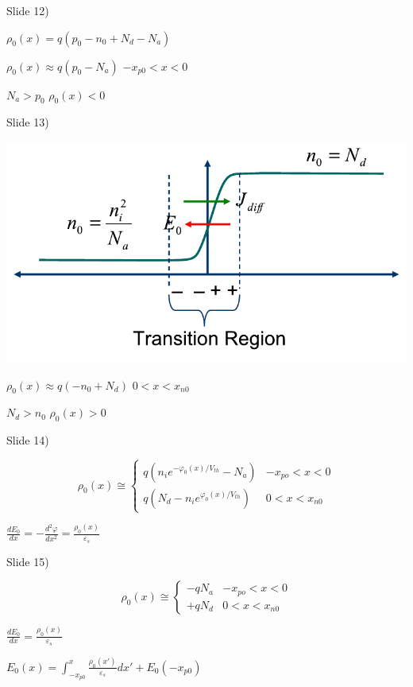 \documentclass{beamer}
\begin{document}
 \begin{frame}{Slide 12)}


 ${\rho _0}(x) = q({p_0} - {n_0} + {N_d} - {N_a})$

 ${\rho _0}(x) \approx q({p_0} - {N_a})$
 $ - {x_{p0}} < x < 0$

 ${N_a} > {p_0}$
 ${\rho _0}(x) < 0$

 \end{frame}

 \begin{frame}{Slide 13)}

\includegraphics[width=.6\columnwidth]{slide13}

 ${\rho _0}(x) \approx q( - {n_0} + {N_d})$
 $0 < x < {x_{n0}}$

 ${N_d} > {n_0}$
 ${\rho _0}(x) > 0$
 \end{frame}

 \begin{frame}{Slide 14)}


 \[
 \rho _0(x) \cong \left\{ 
  \begin{array}{*{20}{c}}
 q({n_i}{e^{ - {\varphi _0}(x)/{V_{th}}}} - {N_a}) &  - {x_{po}} < x < 0\\
 q({N_d} - {n_i}{e^{{\varphi _0}(x)/{V_{th}}}}) & 0 < x < {x_{n0}}
 \end{array} 
 \right.
 \]

 $\frac{{d{E_0}}}{{dx}} =  - \frac{{{d^2}\varphi }}{{d{x^2}}} = \frac{{{\rho _0}(x)}}{{{\varepsilon _s}}}$

 \end{frame}

 \begin{frame}{Slide 15)}


\[
{\rho _0}(x) \cong \left\{ 
	\begin{array}{*{20}{c}}
 		 - q{N_a} &  - {x_{po}} < x < 0\\
 		 + q{N_d} & 0 < x < {x_{n0}}
 \end{array} 
 \right.
 \]

 $\frac{{d{E_0}}}{{dx}} = \frac{{{\rho _0}(x)}}{{{\varepsilon _s}}}$

 ${E_0}(x) = \int_{ - {x_{p0}}}^x {\frac{{{\rho _0}(x')}}{{{\varepsilon _s}}}dx'}  + {E_0}( - {x_{p0}})$
 \end{frame}
\end{document}
